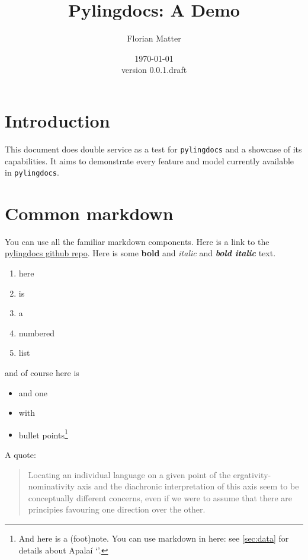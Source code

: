 \documentclass{article}
\title{Pylingdocs: A Demo}
\author{Florian Matter}
\date{\today\\version 0.0.1.draft}
\begin{document}
\maketitle

\tableofcontents


\section{\texorpdfstring{Introduction \label{sec:intro}}{Introduction }}

This document does double service as a test for \texttt{pylingdocs} and
a showcase of its capabilities. It aims to demonstrate every feature and
model currently available in \texttt{pylingdocs}.

\section{Common markdown}

You can use all the familiar markdown components. Here is a link to the
\href{https://github.com/fmatter/pylingdocs/}{pylingdocs github repo}.
Here is some \textbf{bold} and \emph{italic} and \textbf{\emph{bold
italic}} text.

\begin{enumerate}
\def\labelenumi{\arabic{enumi}.}
\tightlist
\item
  here
\item
  is
\item
  a
\item
  numbered
\item
  list
\end{enumerate}

and of course here is

\begin{itemize}
\tightlist
\item
  and one
\item
  with
\item
  bullet points\footnote{And here is a (foot)note. You can use markdown
    in here: see \cref{sec:data} for details about Apalaí 
    `'.}
\end{itemize}

A quote:

\begin{quote}
Locating an individual language on a given point of the
ergativity-nominativity axis and the diachronic interpretation of this
axis seem to be conceptually different concerns, even if we were to
assume that there are principies favouring one direction over the other.
\parencites[71]{alvarez1998split}
\end{quote}
\end{document}
